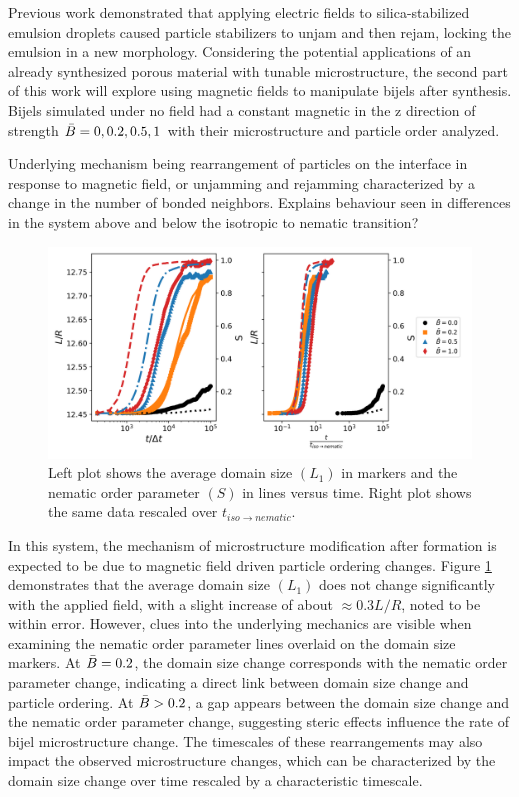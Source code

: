 Previous work demonstrated that applying electric fields to silica-stabilized emulsion droplets caused particle stabilizers to unjam and then rejam, locking the emulsion in a new morphology. \cite{cui_stabilizing_2013} Considering the potential applications of an already synthesized porous material with tunable microstructure, the second part of this work will explore using magnetic fields to manipulate bijels after synthesis. \cite{vanoli_bijels_2022, cha_bicontinuous_2019} Bijels simulated under no field had a constant magnetic in the z direction of strength $\Bar{B} = 0, 0.2, 0.5, 1$ with their microstructure and particle order analyzed.

Underlying mechanism being rearrangement of particles on the interface in response to magnetic field, or unjamming and rejamming characterized by a change in the number of bonded neighbors. Explains behaviour seen in differences in the system above and below the isotropic to nematic transition? 

\begin{figure}
    \centering
    \includegraphics[scale = 0.5]{figures/results/paper2/domain_size.png}
    \caption{Left plot shows the average domain size $(L_1)$ in markers and the nematic order parameter $(S)$ in lines versus time. Right plot shows the same data rescaled over $t_{iso \rightarrow nematic}$.}
    \label{fig:P2_domain_scaling}
\end{figure}

In this system, the mechanism of microstructure modification after formation is expected to be due to magnetic field driven particle ordering changes. Figure \ref{fig:P2_domain_scaling} demonstrates that the average domain size $(L_1)$ does not change significantly with the applied field, with a slight increase of about $\approx 0.3 L/R$, noted to be within error. However, clues into the underlying mechanics are visible when examining the nematic order parameter lines overlaid on the domain size markers. At $\Bar{B} = 0.2$, the domain size change corresponds with the nematic order parameter change, indicating a direct link between domain size change and particle ordering. At $\Bar{B} > 0.2$, a gap appears between the domain size change and the nematic order parameter change, suggesting steric effects influence the rate of bijel microstructure change. The timescales of these rearrangements may also impact the observed microstructure changes, which can be characterized by the domain size change over time rescaled by a characteristic timescale.

